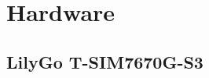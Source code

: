 \documentclass[12pt,a4paper]{article}
\begin{document}
\newpage

\tableofcontents

\newpage

\section{Hardware}

\subsection{LilyGo T-SIM7670G-S3}
\end{document}
